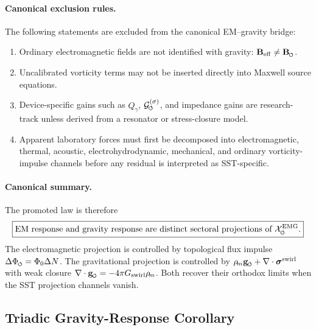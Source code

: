 \documentclass[11pt]{article}
\theoremstyle{definition}
\theoremstyle{plain}
\theoremstyle{remark}
\newcommand{\swirlarrow}{\mathchoice{\mkern-2mu\scriptstyle\boldsymbol{\circlearrowleft}}{\mkern-2mu\scriptstyle\boldsymbol{\circlearrowleft}}{\mkern-2mu\scriptscriptstyle\boldsymbol{\circlearrowleft}}{\mkern-2mu\scriptscriptstyle\boldsymbol{\circlearrowleft}}}
\newcommand{\rhoM}{\rho_{\!m}}
\begin{document}
        \paragraph{Canonical exclusion rules.}
        The following statements are excluded from the canonical EM--gravity bridge:
        \begin{enumerate}
            \item Ordinary electromagnetic fields are not identified with gravity: \(\mathbf{B}_{\mathrm{eff}}\neq\mathbf{B}_{\swirlarrow}\).
            \item Uncalibrated vorticity terms may not be inserted directly into Maxwell source equations.
            \item Device-specific gains such as \(Q_\gamma\), \(\mathcal{G}^{(\sigma)}_{\swirlarrow}\), and impedance gains are research-track unless derived from a resonator or stress-closure model.
            \item Apparent laboratory forces must first be decomposed into electromagnetic, thermal, acoustic, electrohydrodynamic, mechanical, and ordinary vorticity-impulse channels before any residual is interpreted as SST-specific.
        \end{enumerate}

        \paragraph{Canonical summary.}
        The promoted law is therefore
        \begin{align}
            \boxed{
            \text{EM response and gravity response are distinct sectoral projections of }\mathcal{X}^{\mathrm{EMG}}_{\swirlarrow}.
            }
            \label{eq:canonical_emg_summary_law}
        \end{align}
        The electromagnetic projection is controlled by topological flux impulse \(\Delta\Phi_{\swirlarrow}=\Phi_0\Delta N\). The gravitational projection is controlled by \(\rhoM\mathbf{g}_{\swirlarrow}+\nabla\cdot\boldsymbol{\sigma}^{\mathrm{swirl}}\) with weak closure \(\nabla\cdot\mathbf{g}_{\swirlarrow}=-4\pi G_{\mathrm{swirl}}\rhoM\). Both recover their orthodox limits when the SST projection channels vanish.


    \subsection{Triadic Gravity-Response Corollary}
        \label{subsec:triadic_gravity_response_corollary}
\end{document}
